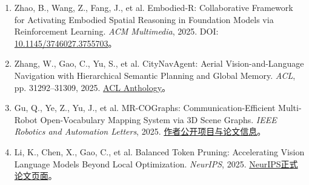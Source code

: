 \begin{enumerate}
    \item Zhao, B., Wang, Z., Fang, J., et al. Embodied-R: Collaborative Framework for Activating Embodied Spatial Reasoning in Foundation Models via Reinforcement Learning. \emph{ACM Multimedia}, 2025. DOI: \href{https://doi.org/10.1145/3746027.3755703}{10.1145/3746027.3755703}。
    \item Zhang, W., Gao, C., Yu, S., et al. CityNavAgent: Aerial Vision-and-Language Navigation with Hierarchical Semantic Planning and Global Memory. \emph{ACL}, pp. 31292--31309, 2025. \href{https://aclanthology.org/2025.acl-long.1511/}{ACL Anthology}。
    \item Gu, Q., Ye, Z., Yu, J., et al. MR-COGraphs: Communication-Efficient Multi-Robot Open-Vocabulary Mapping System via 3D Scene Graphs. \emph{IEEE Robotics and Automation Letters}, 2025. \href{https://github.com/efc-robot/MR-COGraphs}{作者公开项目与论文信息}。
    \item Li, K., Chen, X., Gao, C., et al. Balanced Token Pruning: Accelerating Vision Language Models Beyond Local Optimization. \emph{NeurIPS}, 2025. \href{https://proceedings.neurips.cc/paper_files/paper/2025/hash/5aab3631d0d3131281fb88265db69480-Abstract-Conference.html}{NeurIPS正式论文页面}。
\end{enumerate}
\fussy
